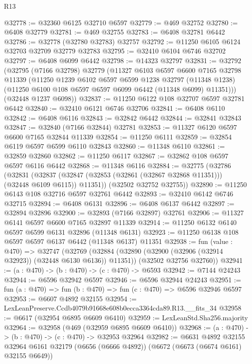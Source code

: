 \begin{lexlean}{R13}
\begin{coremodule}
@32778 := @32360 @6125 @32710 @6597
@32779 := @469 @32752
@32780 := @6408 @32779
@32781 := @469 @32755
@32783 := @6408 @32781 @6442
@32786 := @32778 (@32780 @32783) @32757
@32792 := @11250 @6105 @6124 @32703 @32709 @32779 @32783
@32795 := @32410 @6104 @6746 @32702
@32797 := @6408 @6099 @6442
@32798 := @14323 @32797
@32831 := @32792
    (@32795
      (@7166 @32798)
      @32779
      (@11327
        @6103
        @6597
        @6600
        @7165
        @32798
        @11339
        (@11250
          @1239
          @6102
          @6597
          @6599
          @1238
          @32797
          (@11348 @1238)
          (@11250 @6100 @108 @6597 @6597 @6099 @6442 (@11348 @6099) @11351)))
      (@32448 @1237 @6098))
@32837 := @11250 @6122 @108 @32707 @6597 @32781 @6442
@32840 := @32410 @6121 @6746 @32706
@32841 := @6408 @6110
@32842 := @6408 @6116
@32843 := @32842 @6442
@32844 := @32841 @32843
@32847 := @32840 (@7166 @32844) @32781
@32853 := @11327 @6120 @6597 @6600 @7165 @32844 @11339
@32854 := @11250 @6111
@32859 := @32854 @6119 @6597 @6599 @6110 @32843
@32860 := @11348 @6110
@32861 := @32859 @32860
@32862 := @11250 @6117
@32867 := @32862 @108 @6597 @6597 @6116 @6442
@32868 := @11348 @6116
@32884 := @32775
    (@32786
      (@32831
        (@32837 (@32847 (@32853 (@32861 (@32867 @32868 @11351))) (@32448 @6109 @6115)) @11351))
      (@32502 @32752 @32755))
@32890 := @11250 @6143 @108 @32716 @6597 @32761 @6442
@32893 := @32410 @6142 @6746 @32715
@32894 := @6408 @6131
@32896 := @6408 @6137 @6442
@32897 := @32894 @32896
@32900 := @32893 (@7166 @32897) @32761
@32906 := @11327 @6141 @6597 @6600 @7165 @32897 @11339
@32914 := @11250 @6132 @6140 @6597 @6599 @6131 @32896 (@11348 @6131)
@32923 := @11250 @6138 @108 @6597 @6597 @6137 @6442 (@11348 @6137) @11351
@32938 := fun (value : @470) =>
  @32747
    (@32769
      (@32884 (@32890 (@32900 (@32906 (@32914 @32923)) (@32448 @6130 @6136)) @11351))
      (@32502 @32756 @32760))
@32941 := (a : @470) -> (b : @470) -> (c : @470) -> @6593
@32942 := @7144 @24243
@32944 := @6596 @32942 @6597
@32946 := @6596 @32944 @24243
@32951 := fun (a : @470) => fun (b : @470) => fun (c : @470) => @6596 @32946 @6597
@32953 := @6607 @4892 @32155
@32954 := LexLeanPreserve.Ccdb4079b91668e608b0ecca3364cda89.R13.__fits_34
@32958 := @6617 (@32954 @6895 @6609 @6410)
@32959 := LexLeanStd.Sha256.majority
@32964 := @32958 (@469 (@32959 @6895 @6609 @6410))
@32968 := (a : @470) -> (b : @470) -> (c : @470) -> @32953 @32964
@32982 := @6631
    @4892
    @32155
    @32964
    @6161
    @32179
    (@6656 (@6666 @4892))
    (@6672 (@6673 (@6674 @6161) @32155 @6649))

\end{coremodule}
\end{lexlean}
